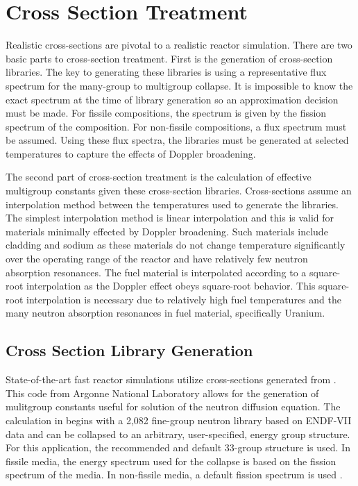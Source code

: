 \section{Cross Section Treatment}
  Realistic cross-sections are pivotal to a realistic reactor simulation. There
  are two basic parts to cross-section treatment. First is the generation of
  cross-section libraries. The key to generating these libraries is using a
  representative flux spectrum for the many-group to multigroup collapse. It is
  impossible to know the exact spectrum at the time of library generation so an
  approximation decision must be made.
  For fissile compositions, the spectrum is given by the
  fission spectrum of the composition. For non-fissile compositions, a flux
  spectrum must be assumed.  Using these flux spectra, the libraries must
  be generated at selected temperatures to capture the effects of Doppler
  broadening.

  The second part of cross-section treatment is the calculation of effective
  multigroup constants given these cross-section libraries. Cross-sections
  assume an interpolation method between the temperatures used to generate the
  libraries. The simplest interpolation method is linear interpolation and this
  is valid for materials minimally effected by Doppler broadening. Such 
  materials include cladding and sodium as these materials do not change
  temperature significantly over the operating range of the reactor and have
  relatively few neutron absorption resonances. The fuel material is
  interpolated according to a square-root interpolation as the Doppler effect
  obeys square-root behavior. This square-root interpolation is necessary due to
  relatively high fuel temperatures and the many neutron absorption resonances
  in fuel material, specifically Uranium.

  \subsection{Cross Section Library Generation}
    State-of-the-art fast reactor simulations utilize cross-sections generated
    from \mcc. This code from Argonne National Laboratory allows for the
    generation of mulitgroup constants useful for solution of the neutron
    diffusion equation. The calculation in \mcc begins with a 2,082 fine-group
    neutron library based on ENDF-VII data and can be collapsed to an
    arbitrary, user-specified, energy group structure. For this application, the
    recommended and default 33-group structure is used. In fissile media, the
    energy spectrum used for the collapse is based on the fission spectrum of
    the media. In non-fissile media, a default  fission spectrum
    is used \cite{mcc}.
    

